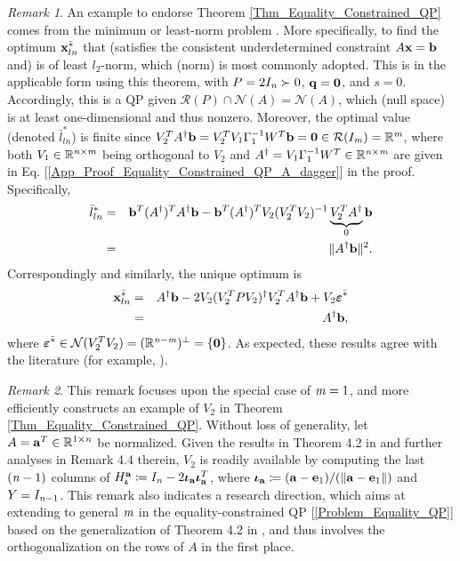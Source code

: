\documentclass[9pt,twocolumn,twoside,lineno]{pnas-new-1}
\newcommand{\beq}{\begin{eqnarray}}
\newcommand{\eeq}{\end{eqnarray}}
\newcommand{\bfa}{{\bf a}}
\newcommand{\bfb}{{\bf b}}
\newcommand{\bfx}{{\bf x}}
\newcommand{\bfq}{{\bf q}}
\newcommand{\bfe}{{\bf e}}
\newcommand{\bfiota}{{\boldsymbol \iota}}
\newcommand{\bfvarepsilon}{{\boldsymbol \varepsilon}}
\newcommand{\bfzero}{{\bf 0}}
\newcommand{\real}{\mathbb{R}}
\newcommand{\calN}{{\mathcal N}}
\newcommand{\calR}{{\mathcal R}}
\newcommand{\itm}{{\it m}}
\newcommand{\itn}{{\it n}}
\theoremstyle{remark}
\newtheorem{remark}{Remark}[section]
\begin{document}
\begin{remark}
An example to endorse Theorem \ref{Thm_Equality_Constrained_QP} comes from the minimum or least-norm problem \citep{BoVa:04,GoVa:13}. More specifically, to find the optimum $\bfx^{\bar *}_{ln}$ that (satisfies the consistent underdetermined constraint $A\bfx=\bfb$ and) is of least $l_2$-norm, which (norm) is most commonly adopted. This is in the applicable form using this theorem, with $P=2I_\itn\succ 0$, $\bfq=\bfzero$, and $s=0$. Accordingly, this is a QP given $\calR(P)\cap\calN(A)=\calN(A)$, which (null space) is at least one-dimensional and thus nonzero. Moreover, the optimal value (denoted $\bar l^*_{ln}$) is finite since $V_2^TA^\dagger\bfb=V_2^TV_1\Gamma_1^{-1}W^T\bfb=\bfzero\in\calR(I_{\itm})=\real^\itm$, where both $V_1\in\real^{\itn\times\itm}$ being orthogonal to $V_2$ and $A^\dagger=V_1\Gamma_1^{-1}W^T\in\real^{\itn\times\itm}$ are given in Eq. [\ref{App_Proof_Equality_Constrained_QP_A_dagger}] in the proof. Specifically,
\beq
\bar l^*_{ln}&=&\bfb^T(A^\dagger)^TA^\dagger\bfb-\bfb^T(A^\dagger)^TV_2(V_2^TV_2)^{-1} \underbrace{V_2^TA^\dagger}_\text{$0$}\bfb\nonumber\\
&=&\Vert A^\dagger\bfb\Vert^2.\nonumber
\eeq
Correspondingly and similarly, the unique optimum is
\beq
\bfx^{\bar *}_{ln}&=&A^\dagger\bfb-2V_2(V_2^TPV_2)^\dagger V_2^TA^\dagger\bfb+V_2\bfvarepsilon^{\bar *}\nonumber\\
&=&A^\dagger\bfb,
\eeq
where $\bfvarepsilon^{\bar *}\in\calN(V_2^TV_2)=(\real^{\itn-\itm})^\perp=\{\bfzero\}$. As expected, these results agree with the literature (for example, \cite{BoVa:04}).
\label{Rem_Least_Norm}
\end{remark}

\begin{remark}
This remark focuses upon the special case of $\itm=1$, and more efficiently constructs an example of $V_2$ in Theorem \ref{Thm_Equality_Constrained_QP}. Without loss of generality, let $A=\bfa^T\in\real^{1\times\itn}$ be normalized. Given the results in Theorem 4.2 in \cite{LiLiHs:20} and further analyses in Remark 4.4 therein, $V_2$ is readily available by computing the last $(\itn-1)$ columns of $H_\bfiota^\bfa\coloneqq I_\itn-2\bfiota_\bfa\bfiota_\bfa^T$, where $\bfiota_\bfa\coloneqq (\bfa-\bfe_1)/(\Vert\bfa-\bfe_1\Vert)$ and $Y=I_{\itn-1}$. This remark also indicates a research direction, which aims at extending to general $\itm$ in the equality-constrained QP [\ref{Problem_Equality_QP}] based on the generalization of Theorem 4.2 in \cite{LiLiHs:20}, and thus involves the orthogonalization on the rows of $A$ in the first place.
\label{Rem_Thm_Equality_Constrained_QP_m_1}
\end{remark}
\end{document}
